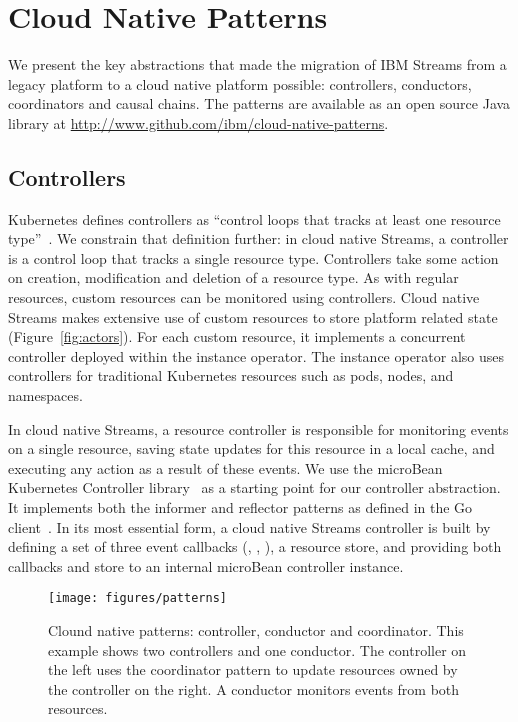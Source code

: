 \section{Cloud Native Patterns}
\label{sec:patterns}

We present the key abstractions that made the migration of IBM Streams from a
legacy platform to a cloud native platform possible: controllers, conductors,
coordinators and causal chains. The patterns are available as an open source
Java library at \url{http://www.github.com/ibm/cloud-native-patterns}.

\subsection{Controllers}
\label{sec:controller}

Kubernetes defines controllers as ``control loops that tracks at least one
resource type''~\cite{kubecontrollers}. We constrain that definition further: in
cloud native Streams, a controller is a control loop that tracks a single
resource type. Controllers take some action on creation, modification and
deletion of a resource type. As with regular resources, custom resources can be
monitored using controllers. Cloud native Streams makes extensive use of custom
resources to store platform related state (Figure~\ref{fig:actors}).
For each custom resource, it implements a concurrent controller deployed within
the instance operator. The instance operator also uses controllers
for traditional Kubernetes resources such as pods, nodes, and namespaces.

In cloud native Streams, a resource controller is responsible for monitoring
events on a single resource, saving state updates for this resource in a local
cache, and executing any action as a result of these events. We use the
microBean Kubernetes Controller library~\cite{microbean} as a starting point for
our controller abstraction. It implements both the informer and reflector
patterns as defined in the Go client~\cite{kubegoclient}.  In its most essential
form, a cloud native Streams controller is built by defining a set of three
event callbacks (, , ), a
resource store, and providing both callbacks and store to an internal microBean
controller instance.

\begin{figure}[ht!]
  \centering
  \texttt{[image: figures/patterns]}
  \caption{Clound native patterns: controller, conductor and coordinator. This example shows 
    two controllers and one conductor. The controller on the left uses the coordinator pattern to 
    update resources owned by the controller on the right. A conductor monitors events from both 
    resources.}
  \label{fig:patterns}
\end{figure}

